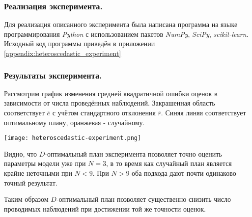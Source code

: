 \subsubsection{Реализация эксперимента.}
Для реализация описанного эксперимента была написана программа на языке программирования \textit{Python} с использованием пакетов \textit{NumPy}, \textit{SciPy}, \textit{scikit-learn}. Исходный код программы приведён в приложении \ref{appendix:heteroscedastic_experiment}

\subsubsection{Результаты эксперимента.}
Рассмотрим график изменения средней квадратичной ошибки оценок в зависимости от числа проведённых наблюдений. Закрашенная область соответствует $\overline e$ с учётом стандартного отклонения $\overline r$. Синяя линяя соответствует оптимальному плану, оранжевая - случайному.
\begin{center}\texttt{[image: heteroscedastic-experiment.png]}\end{center} 

Видно, что $D$-оптимальный план эксперимента позволяет точно оценить параметры модели уже при $N=3$, в то время как случайный план является крайне неточными при $N < 9$. При $N > 9$ оба подхода дают почти одинаково точный результат.

Таким образом $D$-оптимальный план позволяет существенно снизить число проводимых наблюдений при достижении той же точности оценок.


